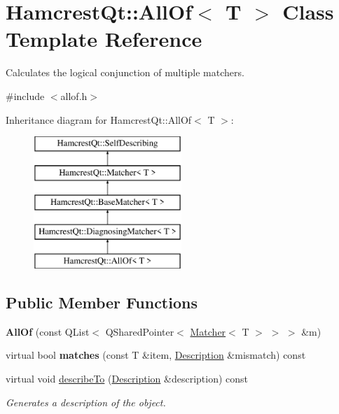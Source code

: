 \hypertarget{class_hamcrest_qt_1_1_all_of}{\section{Hamcrest\-Qt\-:\-:All\-Of$<$ T $>$ Class Template Reference}
\label{class_hamcrest_qt_1_1_all_of}
}


Calculates the logical conjunction of multiple matchers.  




{\ttfamily \#include $<$allof.\-h$>$}

Inheritance diagram for Hamcrest\-Qt\-:\-:All\-Of$<$ T $>$\-:\begin{figure}[H]
\begin{center}
\leavevmode
\includegraphics[height=5.000000cm]{class_hamcrest_qt_1_1_all_of}
\end{center}
\end{figure}
\subsection*{Public Member Functions}
\begin{DoxyCompactItemize}
\item 
\hypertarget{class_hamcrest_qt_1_1_all_of_a6bcbdedcab92058e3581b82672da354e}{{\bfseries All\-Of} (const Q\-List$<$ Q\-Shared\-Pointer$<$ \hyperlink{class_hamcrest_qt_1_1_matcher}{Matcher}$<$ T $>$ $>$ $>$ \&m)}\label{class_hamcrest_qt_1_1_all_of_a6bcbdedcab92058e3581b82672da354e}

\item 
\hypertarget{class_hamcrest_qt_1_1_all_of_ab912069c91c35566bff1d03777d98cd1}{virtual bool {\bfseries matches} (const T \&item, \hyperlink{class_hamcrest_qt_1_1_description}{Description} \&mismatch) const }\label{class_hamcrest_qt_1_1_all_of_ab912069c91c35566bff1d03777d98cd1}

\item 
virtual void \hyperlink{class_hamcrest_qt_1_1_all_of_a0b60757a18e9dc9e9dfd2582cda9d39d}{describe\-To} (\hyperlink{class_hamcrest_qt_1_1_description}{Description} \&description) const 
\begin{DoxyCompactList}\small\item\em Generates a description of the object. \end{DoxyCompactList}\end{DoxyCompactItemize}
